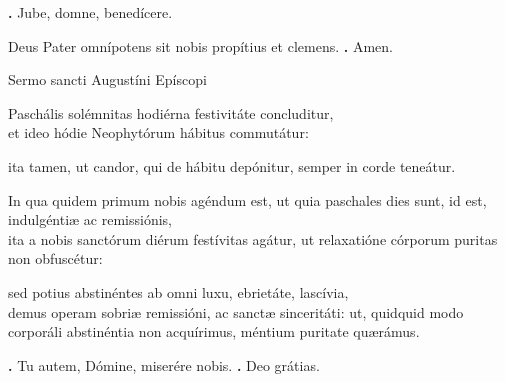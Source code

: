 \begin{small}
\textbf{\Vbar.} Jube, domne, benedícere.

Deus Pater omnípotens sit nobis propítius et clemens. \textbf{\Rbar.} Amen.
\end{small}


Sermo sancti Augustíni Epíscopi

Paschális solémnitas hodiérna festivitáte concluditur, \\
et ideo hódie Neophytórum hábitus commutátur: 

ita tamen, ut candor, qui de hábitu depónitur, semper in corde teneátur. 

In qua quidem primum nobis agéndum est, ut quia paschales dies sunt, id est, indulgéntiæ ac remissiónis, \\
ita a nobis sanctórum diérum festívitas agátur, ut relaxatióne córporum puritas non obfuscétur: 

sed potius abstinéntes ab omni luxu, ebrietáte, lascívia, \\
demus operam sobriæ remissióni, ac sanctæ sinceritáti: 
ut, quidquid modo corporáli abstinéntia non acquírimus, méntium puritate quærámus.

\textbf{\Vbar.} Tu autem, Dómine, miserére nobis.
\textbf{\Rbar.} Deo grátias.

